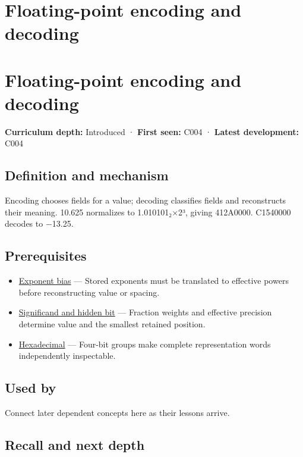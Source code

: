 \hypertarget{appendix-6854d0e2218e}{}
\section*{Floating-point encoding and decoding}
\section{Floating-point encoding and decoding}\label{appendix-6854d0e2218e-floating-point-encoding-and-decoding}

\textbf{Curriculum depth:} Introduced · \textbf{First seen:} C004 · \textbf{Latest development:} C004

\subsection{Definition and mechanism}\label{appendix-6854d0e2218e-definition-and-mechanism}

Encoding chooses fields for a value; decoding classifies fields and reconstructs their meaning. 10.625 normalizes to 1.010101₂×2³, giving 412A0000. C1540000 decodes to −13.25.

\subsection{Prerequisites}\label{appendix-6854d0e2218e-prerequisites}

\begin{itemize}
\tightlist
\item
  \hyperref[appendix-2fae058c82e1]{Exponent bias} --- Stored exponents must be translated to effective powers before reconstructing value or spacing.
\item
  \hyperref[appendix-a24fd710cf67]{Significand and hidden bit} --- Fraction weights and effective precision determine value and the smallest retained position.
\item
  \hyperref[appendix-6b8075763724]{Hexadecimal} --- Four-bit groups make complete representation words independently inspectable.
\end{itemize}

\subsection{Used by}\label{appendix-6854d0e2218e-used-by}

Connect later dependent concepts here as their lessons arrive.

\subsection{Recall and next depth}\label{appendix-6854d0e2218e-recall-and-next-depth}

